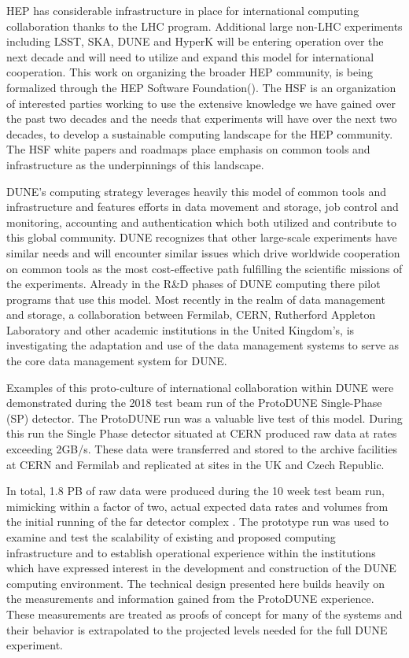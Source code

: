 HEP has considerable infrastructure in place for international computing collaboration thanks to the LHC program.  Additional large non-LHC experiments including LSST, SKA, DUNE and HyperK will be entering operation over the next decade and will need to utilize and expand this model for international cooperation.  This work on organizing the broader HEP community, is being formalized through the HEP Software Foundation().  The HSF is an organization of interested parties working to use the extensive knowledge we have gained over the past two decades and the needs that experiments will have over the next two decades, to develop a sustainable computing landscape for the HEP community.  The HSF white papers and roadmaps place emphasis on common tools and infrastructure as the underpinnings of this landscape.

DUNE's computing strategy leverages heavily this model of common tools and infrastructure and features efforts in data movement and storage, job control and monitoring, accounting and authentication which both utilized and contribute to this global community.   DUNE recognizes that other large-scale experiments have similar needs and will encounter similar issues which drive worldwide cooperation on common tools as the most cost-effective path fulfilling the scientific missions of the experiments.  Already in the R\&D phases of DUNE computing there pilot programs that use this model.  Most recently in the realm of data management and storage, a collaboration between Fermilab, CERN, Rutherford Appleton Laboratory and other academic institutions in the United Kingdom's, is investigating the adaptation and use of the {\it {}}\cite{Barisits:2019fyl} data management systems to serve as the core data management system for DUNE.

Examples of this proto-culture of international collaboration within DUNE were demonstrated during the 2018 test beam run of the ProtoDUNE Single-Phase (SP) detector.  The ProtoDUNE run was a valuable live test of this model.  During this run the Single Phase detector situated at CERN produced raw data at rates exceeding 2GB/s.  These data were transferred and stored to the archive facilities at CERN and Fermilab and replicated at sites in the UK and Czech Republic.

In total, 1.8 PB of raw data were produced during the 10 week test beam run, mimicking within a factor of two, actual expected data rates and volumes from the initial running of the far detector complex .  The prototype run was used to examine and test the scalability of existing and proposed computing infrastructure and to establish operational experience within the institutions which have expressed interest in the development and construction of the DUNE computing environment.  The technical design presented here builds heavily on the measurements and information gained from the ProtoDUNE experience.   These measurements are treated as proofs of concept for many of the systems and their behavior is extrapolated to the projected levels needed for the full DUNE experiment. 


